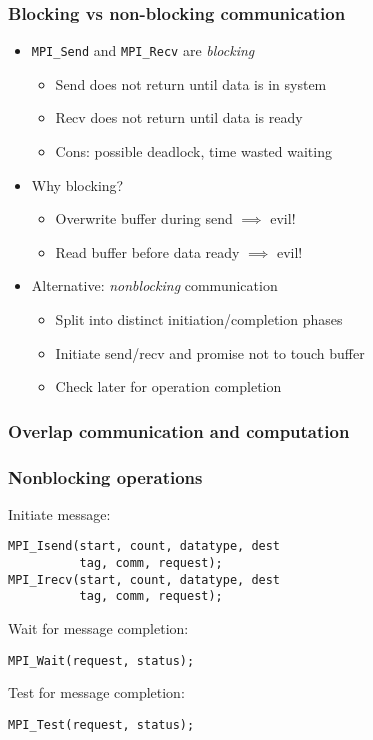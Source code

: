 \documentclass{beamer}
\begin{document}
\begin{frame}
  \frametitle{Blocking vs non-blocking communication}

  \begin{itemize}
  \item {\tt MPI\_Send} and {\tt MPI\_Recv} are {\em blocking}
    \begin{itemize}
    \item Send does not return until data is in system
    \item Recv does not return until data is ready
    \item Cons: possible deadlock, time wasted waiting
    \end{itemize}
  \item Why blocking?
    \begin{itemize}
    \item Overwrite buffer during send $\implies$ evil!
    \item Read buffer before data ready $\implies$ evil!
    \end{itemize}
  \item Alternative: {\em nonblocking} communication
    \begin{itemize}
    \item Split into distinct initiation/completion phases
    \item Initiate send/recv and promise not to touch buffer
    \item Check later for operation completion
    \end{itemize}
  \end{itemize}
\end{frame}


\begin{frame}
  \frametitle{Overlap communication and computation}

  \begin{center}
    
  \end{center}

\end{frame}


\begin{frame}[fragile]
  \frametitle{Nonblocking operations}

Initiate message:
\begin{verbatim}
MPI_Isend(start, count, datatype, dest
          tag, comm, request);
MPI_Irecv(start, count, datatype, dest
          tag, comm, request);
\end{verbatim}

\vspace{5mm}
Wait for message completion:
\begin{verbatim}
MPI_Wait(request, status);
\end{verbatim}

\vspace{5mm}
Test for message completion:
\begin{verbatim}
MPI_Test(request, status);
\end{verbatim}

\end{frame}
\end{document}
